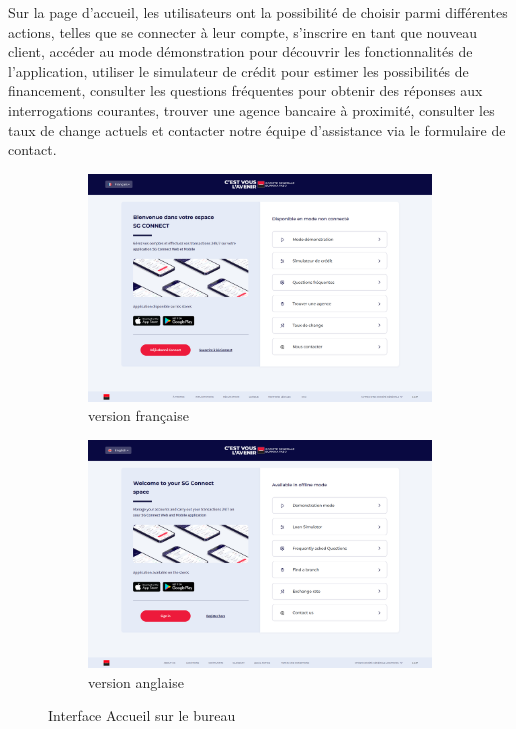 Sur la page d'accueil, les utilisateurs ont la possibilité de choisir parmi différentes actions, telles que se connecter à leur compte, s'inscrire en tant que nouveau client, accéder au mode démonstration pour découvrir les fonctionnalités de l'application, utiliser le simulateur de crédit pour estimer les possibilités de financement, consulter les questions fréquentes pour obtenir des réponses aux interrogations courantes, trouver une agence bancaire à proximité, consulter les taux de change actuels et contacter notre équipe d'assistance via le formulaire de contact.
\begin{figure}[!ht]
    \centering
    \begin{subfigure}[b]{0.49\textwidth}
        \centering
        \includegraphics[width=\textwidth]{images/screens/accueil/desktop.png}
        \caption{version française}
    \end{subfigure}
    \hfill
    \begin{subfigure}[b]{0.49\textwidth}
        \centering
        \includegraphics[width=\textwidth]{images/screens/home/desktop.png}
        \caption{version anglaise}
    \end{subfigure}
       \caption{Interface Accueil sur le bureau}
\end{figure}

